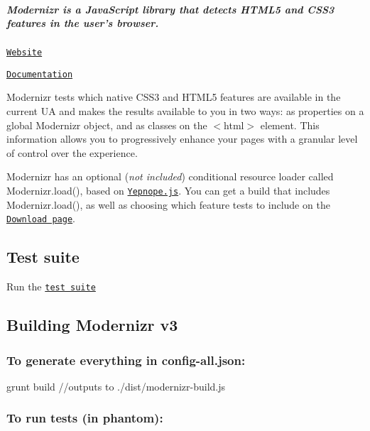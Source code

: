 \subparagraph*{Modernizr is a Java\+Script library that detects H\+T\+M\+L5 and C\+S\+S3 features in the user’s browser.}


\begin{DoxyItemize}
\item \href{http://www.modernizr.com}{\tt Website}
\item \href{http://www.modernizr.com/docs/}{\tt Documentation}
\end{DoxyItemize}

Modernizr tests which native C\+S\+S3 and H\+T\+M\+L5 features are available in the current UA and makes the results available to you in two ways\+: as properties on a global {\ttfamily Modernizr} object, and as classes on the {\ttfamily $<$html$>$} element. This information allows you to progressively enhance your pages with a granular level of control over the experience.

Modernizr has an optional ({\itshape not included}) conditional resource loader called {\ttfamily Modernizr.\+load()}, based on \href{http://yepnopejs.com}{\tt Yepnope.\+js}. You can get a build that includes {\ttfamily Modernizr.\+load()}, as well as choosing which feature tests to include on the \href{http://www.modernizr.com/download/}{\tt Download page}.

\subsection*{Test suite}

Run the \href{http://modernizr.github.com/Modernizr/test/}{\tt test suite}

\subsection*{Building Modernizr v3}

\subsubsection*{To generate everything in \textquotesingle{}config-\/all.\+json\textquotesingle{}\+:}


\begin{DoxyCode}
grunt build
//outputs to ./dist/modernizr-build.js
\end{DoxyCode}


\subsubsection*{To run tests (in phantom)\+:}


